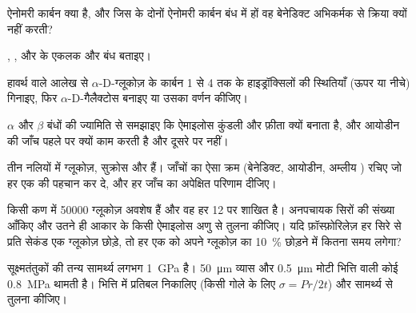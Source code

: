 \begin{exercise}[$\star$]\label{exo:b1:carbohydrates:2}
ऐनोमरी कार्बन क्या है, और जिस  के दोनों ऐनोमरी कार्बन बंध में
हों वह बेनेडिक्ट अभिकर्मक से क्रिया क्यों नहीं करती?
\end{exercise}

\begin{exercise}[$\star$]\label{exo:b1:carbohydrates:3}
, ,  और  के एकलक और बंध बताइए।
\end{exercise}

\begin{exercise}[$\star$]\label{exo:b1:carbohydrates:4}
हावर्थ वाले आलेख से $\alpha$-D-ग्लूकोज़ के कार्बन 1 से 4 तक के
हाइड्रॉक्सिलों की स्थितियाँ (ऊपर या नीचे) गिनाइए, फिर
$\alpha$-D-गैलैक्टोस बनाइए या उसका वर्णन कीजिए।
\end{exercise}

\begin{exercise}[$\star\star$]\label{exo:b1:carbohydrates:5}
$\alpha$ और $\beta$ बंधों की ज्यामिति से समझाइए कि ऐमाइलोस कुंडली और
 फ़ीता क्यों बनाता है, और आयोडीन की जाँच पहले पर क्यों काम करती है
और दूसरे पर नहीं।
\end{exercise}

\begin{exercise}[$\star\star$]\label{exo:b1:carbohydrates:6}
तीन नलियों में ग्लूकोज़, सुक्रोस और  हैं। जाँचों का ऐसा क्रम
(बेनेडिक्ट, आयोडीन, अम्लीय ) रचिए जो हर एक की पहचान कर दे, और हर
जाँच का अपेक्षित परिणाम दीजिए।
\end{exercise}

\begin{exercise}[$\star\star$]\label{exo:b1:carbohydrates:7}
किसी  कण में \num{50000} ग्लूकोज़ अवशेष हैं और वह हर 12 पर
शाखित है। अनपचायक सिरों की संख्या आँकिए और उतने ही आकार के किसी ऐमाइलोस
अणु से तुलना कीजिए। यदि फ़ॉस्फ़ोरिलेज़ हर सिरे से प्रति सेकंड एक
ग्लूकोज़ छोड़े, तो हर एक को अपने ग्लूकोज़ का \qty{10}{\%} छोड़ने में
कितना समय लगेगा?
\end{exercise}

\begin{exercise}[$\star\star$]\label{exo:b1:carbohydrates:8}
 सूक्ष्मतंतुकों की तन्य सामर्थ्य लगभग \qty{1}{GPa} है।
\qty{50}{\micro m} व्यास और \qty{0.5}{\micro m} मोटी भित्ति वाली कोई
 \qty{0.8}{MPa}  थामती है। भित्ति में प्रतिबल निकालिए
(किसी गोले के लिए $\sigma = Pr/2t$) और सामर्थ्य से तुलना कीजिए।
\end{exercise}

